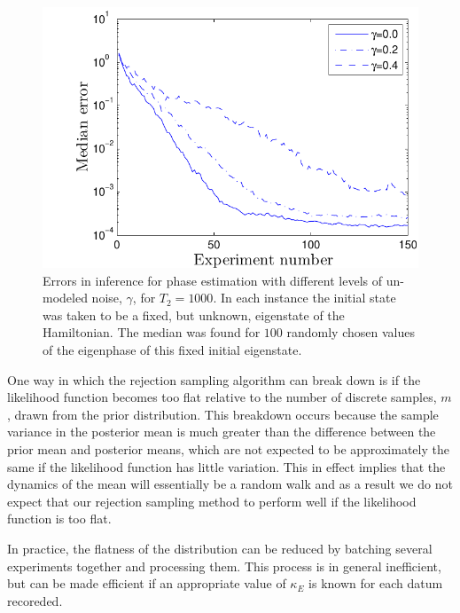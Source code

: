 \documentclass[aps,pra,amsmath,twocolumn,amssymb,superscriptaddress]{revtex4-1}
\begin{document}
{\begin{figure}
    \begin{centering}
\includegraphics[width=0.45\linewidth]{Gammascale.pdf}
    \end{centering}
    \caption{\label{fig:gamma}
Errors in inference for phase estimation with different levels of un-modeled noise, $\gamma$, for $T_2=1000$.  In each instance the initial state was taken to be a fixed, but unknown, eigenstate of the Hamiltonian.  The median was found for $100$ randomly chosen values of the eigenphase of this fixed initial eigenstate.
    }
\end{figure}

One way in which the rejection sampling algorithm can break down is if the likelihood function becomes too flat relative to the number of discrete samples, $m$, drawn from the prior distribution.  This breakdown occurs because the sample variance in the posterior mean is much greater than the difference between the prior mean and posterior means, which are not expected to be approximately the same if the likelihood function has little variation.  This in effect implies that the dynamics of the mean will essentially be a random walk and as a result we do not expect that our rejection sampling method to perform well if the likelihood function is too flat.  

In practice, the flatness of the distribution can be reduced by batching several experiments together and processing them.  This process is in general inefficient, but can be made efficient if an appropriate value of $\kappa_E$ is known for each datum recoreded.

}
\end{document}

